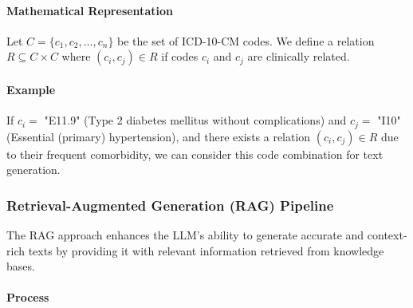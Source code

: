 \documentclass[12pt, a4paper]{article}
\begin{document}
\paragraph{Mathematical Representation}

Let \( C = \{c_1, c_2, ..., c_n\} \) be the set of ICD-10-CM codes. We define a relation \( R \subseteq C \times C \) where \( (c_i, c_j) \in R \) if codes \( c_i \) and \( c_j \) are clinically related.

\paragraph{Example}

If \( c_i = \) "E11.9" (Type 2 diabetes mellitus without complications) and \( c_j = \) "I10" (Essential (primary) hypertension), and there exists a relation \( (c_i, c_j) \in R \) due to their frequent comorbidity, we can consider this code combination for text generation.

\subsubsection{Retrieval-Augmented Generation (RAG) Pipeline}

The RAG approach enhances the LLM's ability to generate accurate and context-rich texts by providing it with relevant information retrieved from knowledge bases.

\paragraph{Process}
\end{document}
